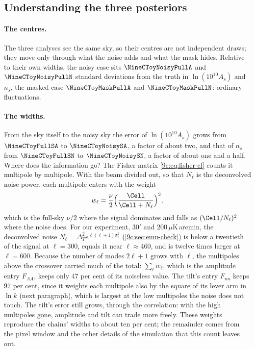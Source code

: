 \subsection{Understanding the three posteriors}
\label{9c:sec:toy-understand}

\paragraph{The centres.} The three analyses see the same sky, so their centres are not independent draws; they
move only through what the noise adds and what the mask hides. Relative to their own widths, the noisy case sits
$\NineCToyNoisyPullA$ and $\NineCToyNoisyPullN$ standard deviations from the truth in $\ln(10^{10}A_s)$ and $n_s$,
the masked case $\NineCToyMaskPullA$ and $\NineCToyMaskPullN$: ordinary fluctuations.

\paragraph{The widths.} From the sky itself to the noisy sky the error of $\ln(10^{10}A_s)$ grows from
$\NineCToyFullSA$ to $\NineCToyNoisySA$, a factor of about two, and that of $n_s$ from $\NineCToyFullSN$ to
$\NineCToyNoisySN$, a factor of about one and a half. Where does the information go? The Fisher matrix
\eqref{9c:eq:fisher-cl} counts it multipole by multipole. With the beam divided out, so that $N_\ell$ is the
deconvolved noise power, each multipole enters with the weight
\[
  w_\ell=\frac\nu2\Bigl(\frac{\Cell}{\Cell+N_\ell}\Bigr)^2 ,
\]
which is the full-sky $\nu/2$ where the signal dominates and falls as $(\Cell/N_\ell)^2$ where the noise does. For our
experiment, $30'$ and $200\,\mu$K\,arcmin, the deconvolved noise $N_\ell=\Delta_T^2e^{\ell(\ell+1)\sigma_b^2}$
(\cref{9c:sec:emu-check}) is below a twentieth of the signal at $\ell=300$, equals it near $\ell\approx460$, and is
twelve times larger at $\ell=600$. Because the number of modes $2\ell+1$ grows with $\ell$, the multipoles above
the crossover carried much of the total: $\sum_\ell w_\ell$, which is the amplitude entry $F_{AA}$, keeps only 47 per
cent of its noiseless value. The tilt's entry $F_{nn}$ keeps 97 per cent, since it weights each multipole also by the
square of its lever arm in $\ln k$ (next paragraph), which is largest at the low multipoles the noise does not touch.
The tilt's error still grows, through the correlation: with the high multipoles gone, amplitude and tilt can trade
more freely. These weights reproduce the chains' widths to about ten per cent; the remainder comes from the pixel window
and the other details of the simulation that this count leaves out.


